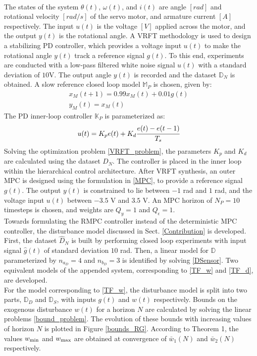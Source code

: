 \documentclass[letterpaper, 10 pt, conference]{ieeeconf}  %
\begin{document}
	\normalsize\\
	The states of the system $\theta(t)$, $\omega(t)$, and $i(t)$ are angle $[rad]$ and rotational velocity $[rad/s]$ of the servo motor, and armature current $[A]$ respectively. The input $u(t)$ is the voltage $[V]$ applied across the motor, and the output $y(t)$ is the rotational angle. 
	A VRFT methodology is used to design a stabilizing PD controller, which provides a voltage input $u(t)$ to make the rotational angle $y(t)$ track a reference signal $g(t)$. To this end, experiments are conducted with a low-pass filtered white noise signal $u(t)$ with a standard deviation of $10$V. The output angle $y(t)$ is recorded and the dataset $\mathbb{D}_N$ is obtained. A slow reference closed loop model $\mathbb{M}_P$ is chosen, given by:
	\begin{equation*}
	\begin{matrix}
	x_M(t+1) = 0.99x_M(t) + 0.01g(t)\\
	y_M(t) = x_M(t)
	\end{matrix}
	\end{equation*}
	The PD inner-loop controller $\mathbb{K}_P$ is parameterized as:
	\begin{equation*}
	u(t) = K_pe(t) + K_d\cfrac{e(t)-e(t-1)}{T_s}
	\end{equation*} 
	Solving the optimization problem \eqref{VRFT_problem}, the parameters 
	$K_p$ and $K_d$ are calculated using the dataset $D_N$. The controller is placed in the inner loop within the hierarchical control architecture.
	After VRFT synthesis, an outer MPC is designed using the formulation in \eqref{MPC}, to provide a reference signal $g(t)$. The output $y(t)$ is constrained to lie between $-1$ rad and $1$ rad, and the voltage input $u(t)$ between $-3.5$ V and $3.5$ V. An MPC horizon of $N_P=10$ timesteps is chosen, and weights are $Q_y=1$ and $Q_{\epsilon}=1$. \\
	Towards formulating the RMPC controller instead of the deterministic MPC controller, the disturbance model discussed in Sect. \ref{Contribution} is developed. First, the dataset $\hat{D}_N$ is built by performing closed loop experiments with input signal $\hat{g}(t)$ of standard deviation $10$ rad. Then, a linear model for $\mathbb{D}$ parameterized by $n_{a_D} = 4$ and $n_{b_D} = 3$ is identified by solving \eqref{DSensor}. Two equivalent models of the appended system, corresponding to \eqref{TF_w} and \eqref{TF_d}, are developed.  \\ 
	\indent For the model corresponding to \eqref{TF_w}, the disturbance model is split into two parts, $\mathbb{D}_D$ and $\mathbb{D}_S$, with inputs $g(t)$ and $w(t)$ respectively. Bounds on the exogenous disturbance $w(t)$ for a horizon $N$ are calculated by solving the linear problems \eqref{bound_problem}. The evolution of these bounds with increasing values of horizon $N$ is plotted in Figure \ref{bounds_RG}.  According to Theorem 1, the values $w_{\rm min}$ and $w_{\rm max}$ are obtained at convergence of  $\bar{w}_1(N)$ and $\bar{w}_2(N)$ respectively.
\end{document}
